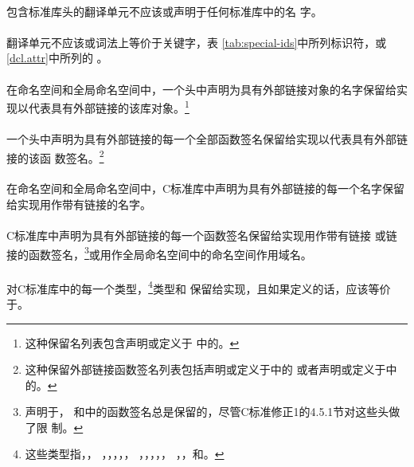 \paragraph{}
包含标准库头的翻译单元不应该或声明于任何标准库中的名
字。

\paragraph{}
翻译单元不应该或词法上等价于关键字，表
\ref{tab:special-ids}中所列标识符，或\ref{dcl.attr}中所列的
。

\paragraph{}
在命名空间和全局命名空间中，一个头中声明为具有外部链接对象的名字保留给实
现以代表具有外部链接的该库对象。\footnote{这种保留名列表包含声明或定义于
中的。}

\paragraph{}
一个头中声明为具有外部链接的每一个全部函数签名保留给实现以代表具有外部链接的该函
数签名。\footnote{这种保留外部链接函数签名列表包括声明或定义于中的
或者声明或定义于中的。}

\paragraph{}
在命名空间和全局命名空间中，C标准库中声明为具有外部链接的每一个名字保留
给实现用作带有链接的名字。

\paragraph{}
C标准库中声明为具有外部链接的每一个函数签名保留给实现用作带有链接
或链接的函数签名，\footnote{声明于，
和中的函数签名总是保留的，尽管C标准修正1的4.5.1节对这些头做了限
制。}或用作全局命名空间中的命名空间作用域名。

\paragraph{}
对C标准库中的每一个类型，\footnote{这些类型指，，
，，，，，
，，，，，
，，和。}类型和
保留给实现，且如果定义的话，应该等价于。

